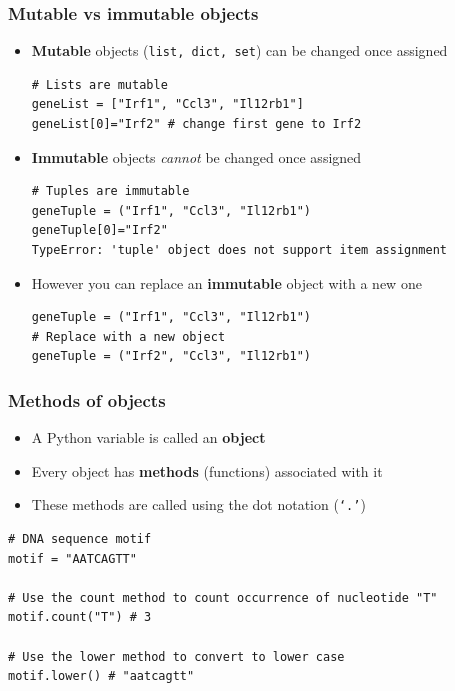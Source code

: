 \documentclass[pdf]{beamer}
\begin{document}
\begin{frame}[fragile]
\frametitle{Mutable vs immutable objects}

\begin{itemize}

\item<1-> \textbf{Mutable} objects (\texttt{list, dict, set}) can be changed once assigned
\begin{lstlisting}[style=python]
# Lists are mutable
geneList = ["Irf1", "Ccl3", "Il12rb1"]
geneList[0]="Irf2" # change first gene to Irf2
\end{lstlisting}  

\item<2-> \textbf{Immutable} objects \textit{cannot} be changed once assigned 
\begin{lstlisting}[style=python]
# Tuples are immutable
geneTuple = ("Irf1", "Ccl3", "Il12rb1")
geneTuple[0]="Irf2"
TypeError: 'tuple' object does not support item assignment
\end{lstlisting}  

\item<3-> However you can replace an \textbf{immutable} object with a new one 
\begin{lstlisting}[style=python]
geneTuple = ("Irf1", "Ccl3", "Il12rb1")
# Replace with a new object
geneTuple = ("Irf2", "Ccl3", "Il12rb1")
\end{lstlisting} 

\end{itemize}

\end{frame}

\begin{frame}[fragile]
\frametitle{Methods of objects}

\begin{itemize}\addtolength{\itemsep}{0.5\baselineskip}
	\item A Python variable is called an \textbf{object}
	\item Every object has \textbf{methods} (functions) associated with it
	\item These methods are called using the dot notation (\texttt{`.'})
\end{itemize}
\begin{lstlisting}[style=python]
# DNA sequence motif
motif = "AATCAGTT"

# Use the count method to count occurrence of nucleotide "T" 
motif.count("T") # 3

# Use the lower method to convert to lower case
motif.lower() # "aatcagtt"
\end{lstlisting} 

\end{frame}
\end{document}
